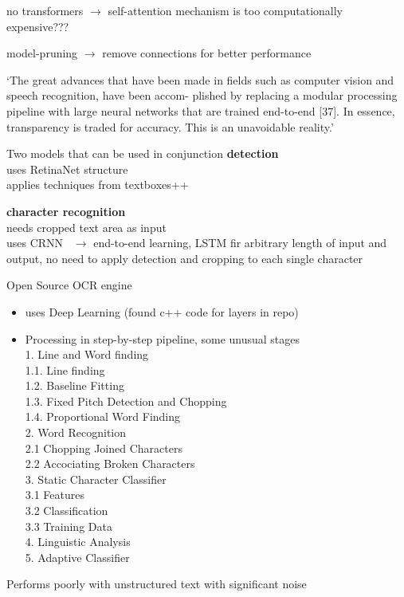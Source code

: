 no transformers $\rightarrow$ self-attention mechanism is too computationally expensive???

model-pruning $\rightarrow$ remove connections for better performance

`The great advances that have been made in fields such as computer vision and speech recognition,
have been accom- plished by replacing a modular processing pipeline with large neural networks
that are trained end-to-end [37]. In essence, transparency is traded for accuracy.
This is an unavoidable reality.'\citep{arpteg_software_2018}


Two models that can be used in conjunction
\textbf{detection}~\citep{beom_text_2021}\\
uses RetinaNet structure~\citep{lin_focal_2018}\\
applies techniques from textboxes++~\citep{liao_textboxes_2018}

\textbf{character recognition}~\citep{beom_crnn_2021}\\
needs cropped text area as input\\
uses CRNN~\citep{shi_end--end_2015} $\rightarrow$ end-to-end learning, LSTM fir arbitrary length of
input and output, no need to apply detection and cropping to each single character

Open Source OCR engine~\citep{smith_overview_2007}
\begin{itemize}
    \item uses Deep Learning (found c++ code for layers in repo)
    \item Processing in step-by-step pipeline, some unusual stages\\
        1. Line and Word finding\\
        1.1. Line finding\\
        1.2. Baseline Fitting\\
        1.3. Fixed Pitch Detection and Chopping\\
        1.4. Proportional Word Finding\\
        2. Word Recognition\\
        2.1 Chopping Joined Characters\\
        2.2 Accociating Broken Characters\\
        3. Static Character Classifier\\
        3.1 Features\\
        3.2 Classification\\
        3.3 Training Data\\
        4. Linguistic Analysis\\
        5. Adaptive Classifier
\end{itemize}
Performs poorly with unstructured text with significant noise

